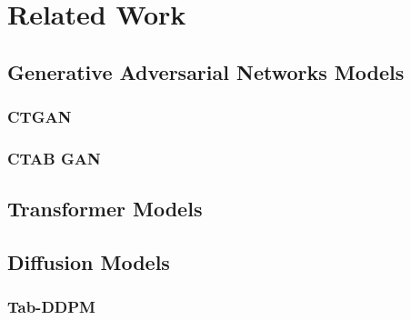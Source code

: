 \chapter{Related Work}
\label{ch:relatedWork}
\section{Generative Adversarial Networks Models}
\label{ch:relatedWork-generativeAdversarialNetworksModels}

\subsection{CTGAN}
\label{ch:relatedWork-generativeAdversarialNetworksModels-ctgan}

\subsection{CTAB GAN}
\label{ch:relatedWork-generativeAdversarialNetworksModels-ctabGAN}
\section{Transformer Models}
\label{ch:relatedWork-transformers}
\section{Diffusion Models}
\label{ch:relatedWork-diffusionModels}

\subsection{Tab-DDPM}
\label{ch:relatedWork-diffusionModels-tabDDPM}



